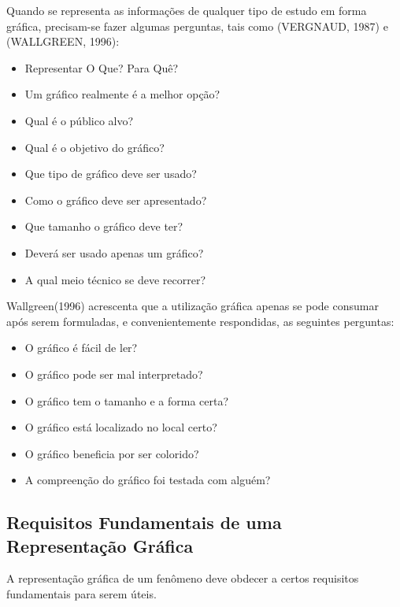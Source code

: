 \newpage
Quando se representa as informações de qualquer tipo de estudo em forma gráfica, precisam-se fazer algumas perguntas, tais como (VERGNAUD, 1987) e (WALLGREEN, 1996):

\begin{itemize}
\item Representar O Que? Para Quê?
\item Um gráfico realmente é a melhor opção?
\item Qual é o público alvo?
\item Qual é o objetivo do gráfico?
\item Que tipo de gráfico deve ser usado?
\item Como o gráfico deve ser apresentado?
\item Que tamanho o gráfico deve ter?
\item Deverá ser usado apenas um gráfico?
\item A qual meio técnico se deve recorrer?
\end{itemize}

Wallgreen(1996) acrescenta que a utilização gráfica apenas se pode
consumar após serem formuladas, e convenientemente respondidas, as
seguintes perguntas:

\begin{itemize}
\item O gráfico é fácil de ler? \item O gráfico pode ser mal
interpretado? \item O gráfico tem o tamanho e a forma certa? \item
O gráfico está localizado no local certo? \item O gráfico
beneficia por ser colorido? \item A compreenção do gráfico foi
testada com alguém?
\end{itemize}



\subsection{Requisitos Fundamentais de uma Representação Gráfica}

A representação gráfica de um fenômeno deve obdecer a certos
requisitos fundamentais para serem úteis.

